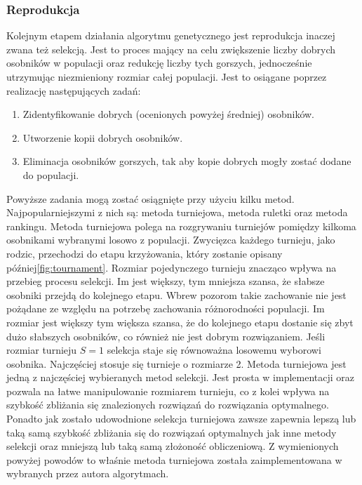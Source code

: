 \documentclass[twoside]{iisthesis}
\begin{document}
\subsubsection{Reprodukcja}
Kolejnym etapem działania algorytmu genetycznego jest reprodukcja inaczej zwana też selekcją. Jest to proces mający na celu zwiększenie liczby dobrych osobników w populacji oraz redukcję liczby tych gorszych, jednocześnie utrzymując niezmieniony rozmiar całej populacji. Jest to osiągane poprzez realizację następujących zadań:\\
\begin{enumerate}
	\item Zidentyfikowanie dobrych (ocenionych powyżej średniej) osobników.
	\item Utworzenie kopii dobrych osobników.
	\item Eliminacja osobników gorszych, tak aby kopie dobrych mogły zostać dodane do populacji.\\
\end{enumerate}
Powyższe zadania mogą zostać osiągnięte przy użyciu kilku metod. Najpopularniejszymi z nich są: metoda turniejowa, metoda ruletki oraz metoda rankingu.
Metoda turniejowa polega na rozgrywaniu turniejów pomiędzy kilkoma osobnikami wybranymi losowo z populacji. Zwycięzca każdego turnieju, jako rodzic, przechodzi do etapu krzyżowania, który zostanie opisany później\eqref{fig:tournament}. Rozmiar pojedynczego turnieju znacząco wpływa na przebieg procesu selekcji. Im jest większy, tym mniejsza szansa, że słabsze osobniki przejdą do kolejnego etapu. Wbrew pozorom takie zachowanie nie jest pożądane ze względu na potrzebę zachowania różnorodności populacji. Im rozmiar jest większy tym większa szansa, że do kolejnego etapu dostanie się zbyt dużo słabszych osobników, co również nie jest dobrym rozwiązaniem. Jeśli rozmiar turnieju $S = 1$ selekcja staje się równoważna losowemu wyborowi osobnika. Najczęściej stosuje się turnieje o rozmiarze 2. Metoda turniejowa jest jedną z najczęściej wybieranych metod selekcji. Jest prosta w implementacji oraz pozwala na łatwe manipulowanie rozmiarem turnieju, co z kolei wpływa na szybkość zbliżania się znalezionych rozwiązań do rozwiązania optymalnego. Ponadto jak zostało udowodnione selekcja turniejowa zawsze zapewnia lepszą lub taką samą szybkość zbliżania się do rozwiązań optymalnych jak inne metody selekcji oraz mniejszą lub taką samą złożoność obliczeniową. Z wymienionych powyżej powodów to właśnie metoda turniejowa została zaimplementowana w wybranych przez autora algorytmach.
\end{document}
